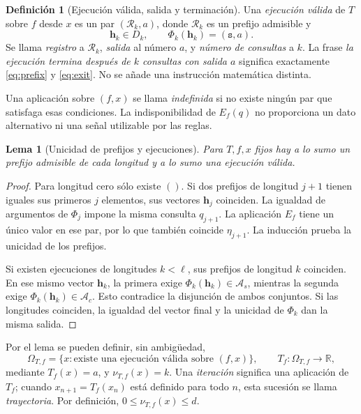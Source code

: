 \documentclass[11pt,a4paper]{article}
\numberwithin{equation}{section}
\newtheorem{lemma}[theorem]{Lema}
\theoremstyle{definition}
\newtheorem{definition}[theorem]{Definición}
\theoremstyle{remark}
\newcommand{\R}{\mathbb R}
\newcommand{\Rec}{\mathcal R}
\newcommand{\hc}{\mathbf h}
\newcommand{\st}{\mathtt s}
\begin{document}
\begin{definition}[Ejecución válida, salida y terminación]\label{def:execution}
Una \emph{ejecución válida} de $T$ sobre $f$ desde $x$ es un par $(\Rec_k,a)$, donde $\Rec_k$ es un prefijo admisible y
\begin{equation}\label{eq:exit}
\hc_k\in D_k,\qquad \Phi_k(\hc_k)=(\st,a).
\end{equation}
Se llama \emph{registro} a $\Rec_k$, \emph{salida} al número $a$, y \emph{número de consultas} a $k$. La frase \emph{la ejecución termina después de $k$ consultas con salida $a$} significa exactamente \eqref{eq:prefix} y \eqref{eq:exit}. No se añade una instrucción matemática distinta.

Una aplicación sobre $(f,x)$ se llama \emph{indefinida} si no existe ningún par que satisfaga esas condiciones. La indisponibilidad de $E_f(q)$ no proporciona un dato alternativo ni una señal utilizable por las reglas.
\end{definition}

\begin{lemma}[Unicidad de prefijos y ejecuciones]\label{lem:unique}
Para $T,f,x$ fijos hay a lo sumo un prefijo admisible de cada longitud y a lo sumo una ejecución válida.
\end{lemma}
\begin{proof}
Para longitud cero sólo existe $()$. Si dos prefijos de longitud $j+1$ tienen iguales sus primeros $j$ elementos, sus vectores $\hc_j$ coinciden. La igualdad de argumentos de $\Phi_j$ impone la misma consulta $q_{j+1}$. La aplicación $E_f$ tiene un único valor en ese par, por lo que también coincide $\eta_{j+1}$. La inducción prueba la unicidad de los prefijos.

Si existen ejecuciones de longitudes $k<\ell$, sus prefijos de longitud $k$ coinciden. En ese mismo vector $\hc_k$, la primera exige $\Phi_k(\hc_k)\in\mathcal A_s$, mientras la segunda exige $\Phi_k(\hc_k)\in\mathcal A_c$. Esto contradice la disjunción de ambos conjuntos. Si las longitudes coinciden, la igualdad del vector final y la unicidad de $\Phi_k$ dan la misma salida.
\end{proof}

Por el lema se pueden definir, sin ambigüedad,
\[
\Omega_{T,f}=\{x:\text{existe una ejecución válida sobre }(f,x)\},\qquad
T_f:\Omega_{T,f}\to\R,
\]
mediante $T_f(x)=a$, y $\nu_{T,f}(x)=k$. Una \emph{iteración} significa una aplicación de $T_f$; cuando $x_{n+1}=T_f(x_n)$ está definido para todo $n$, esta sucesión se llama \emph{trayectoria}. Por definición, $0\le\nu_{T,f}(x)\le d$.
\end{document}
